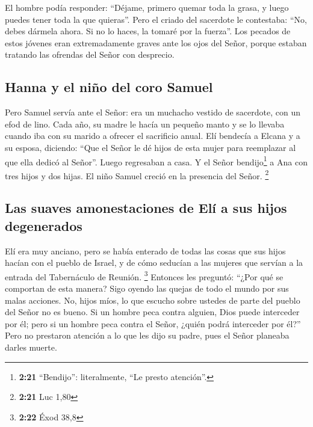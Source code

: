  El hombre podía responder: ``Déjame, primero quemar toda
la grasa, y luego puedes tener toda la que quieras''. Pero el criado del
sacerdote le contestaba: ``No, debes dármela ahora. Si no lo haces, la
tomaré por la fuerza''.  Los pecados de estos jóvenes
eran extremadamente graves ante los ojos del Señor, porque estaban
tratando las ofrendas del Señor con desprecio.

\hypertarget{hanna-y-el-niuxf1o-del-coro-samuel}{%
\subsection{Hanna y el niño del coro
Samuel}\label{hanna-y-el-niuxf1o-del-coro-samuel}}

 Pero Samuel servía ante el Señor: era un muchacho
vestido de sacerdote, con un efod de lino.  Cada año, su
madre le hacía un pequeño manto y se lo llevaba cuando iba con su marido
a ofrecer el sacrificio anual.  Elí bendecía a Elcana y a
su esposa, diciendo: ``Que el Señor le dé hijos de esta mujer para
reemplazar al que ella dedicó al Señor''. Luego regresaban a casa.
 Y el Señor bendijo\footnote{\textbf{2:21} ``Bendijo'':
  literalmente, ``Le presto atención''.} a Ana con tres hijos y dos
hijas. El niño Samuel creció en la presencia del Señor. \footnote{\textbf{2:21}
  Luc 1,80}

\hypertarget{las-suaves-amonestaciones-de-eluxed-a-sus-hijos-degenerados}{%
\subsection{Las suaves amonestaciones de Elí a sus hijos
degenerados}\label{las-suaves-amonestaciones-de-eluxed-a-sus-hijos-degenerados}}

 Elí era muy anciano, pero se había enterado de todas las
cosas que sus hijos hacían con el pueblo de Israel, y de cómo seducían a
las mujeres que servían a la entrada del Tabernáculo de Reunión.
\footnote{\textbf{2:22} Éxod 38,8}  Entonces les
preguntó: ``¿Por qué se comportan de esta manera? Sigo oyendo las quejas
de todo el mundo por sus malas acciones.  No, hijos míos,
lo que escucho sobre ustedes de parte del pueblo del Señor no es bueno.
 Si un hombre peca contra alguien, Dios puede interceder
por él; pero si un hombre peca contra el Señor, ¿quién podrá interceder
por él?'' Pero no prestaron atención a lo que les dijo su padre, pues el
Señor planeaba darles muerte.


